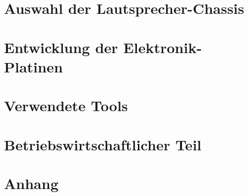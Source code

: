 \documentclass[paper=a4, 12pt, twoside]{scrreprt}
\begin{document}
\chapter{Auswahl der Lautsprecher-Chassis}
%







\chapter{Entwicklung der Elektronik-Platinen}
%

%
%

%
%



\chapter{Verwendete Tools}


\chapter{Betriebswirtschaftlicher Teil}




\chapter{Anhang}


\appendix


\setcounter{lofdepth}{2}
\dipalistoffigures

\end{document}
